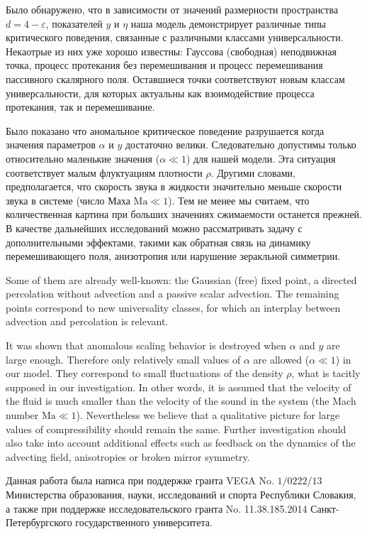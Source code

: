\documentclass[12pt]{article}
\def\eps{\varepsilon}
\begin{document}
Было обнаружено, что в зависимости от значений размерности пространства $d=4-\eps$, показателей $y$ и $\eta$ наша модель демонстрирует различные типы критического поведения, связанные с различными классами универсальности.
Некаотрые из них уже хорошо известны: Гауссова (свободная) неподвижная точка, процесс протекания без перемешивания и процесс перемешивания пассивного скалярного поля.
Оставшиеся точки соответствуют новым классам универсальности, для которых актуальны как взоимодействие процесса протекания, так и перемешивание.

Было показано \cite{GV99} что аномальное критическое поведение разрушается когда значения параметров $\alpha$ и $y$ достаточно велики.
Следовательно допустимы только относительно маленькие значения ($\alpha \ll 1$) для нашей модели. 
Эта ситуация соответствует малым флуктуациям плотности $\rho$. Другими словами, предполагается, что скорость звука в жидкости значительно меньше скорости звука в системе (число Маха $\mathrm{Ma} \ll 1$).
Тем не менее мы считаем, что количественная картина при больших значениях сжимаемости останется прежней.
В качестве дальнейших исследований можно рассматривать задачу с дополнительными эффектами, такими как обратная связь на динамику перемешивающего поля, анизотропия или нарушение зеракльной симметрии.

Some of them are already well-known: the Gaussian (free) fixed point,
 a directed percolation without advection and a passive scalar advection. The remaining
 points correspond to new universality classes, for which an interplay
between advection and percolation is relevant.

It was shown \cite{GV99} that anomalous scaling behavior is destroyed when $\alpha$ and $y$ are large
enough. Therefore only relatively small values of
$\alpha$ are allowed ($\alpha \ll 1$) in our model. They correspond to small fluctuations of the density 
$\rho$, what is tacitly supposed in our investigation. In other words, it is assumed that the
 velocity of the fluid is much smaller than the velocity
of the sound in the system (the Mach number $\mathrm{Ma} \ll 1$). 
 Nevertheless we believe that a qualitative picture for
large values of compressibility should remain the same.
Further investigation should also take into account additional effects such as feedback on the dynamics of the
advecting field, anisotropies or broken mirror symmetry.

Данная работа была написа при поддержке гранта VEGA No. $1/0222/13$ Министерства образования, науки, исследований и спорта Республики Словакия, а также при поддержке исследовательского гранта No. 11.38.185.2014 Санкт-Петербургского государственного университета.
\end{document}
